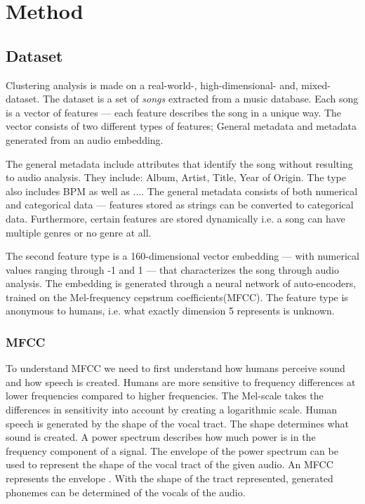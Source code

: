 \documentclass[../report.tex]{subfiles}
\begin{document}
\chapter{Method}
\section{Dataset}

Clustering analysis is made on a real-world-, high-dimensional- and, mixed-dataset. The dataset is a set of \textit{songs} extracted from a music database. Each song is a vector of features --- each feature describes the song in a unique way. The vector consists of two different types of features; General metadata and metadata generated from an audio embedding.

The general metadata include attributes that identify the song without resulting to audio analysis. They include: Album, Artist, Title, Year of Origin. The type also includes BPM as well as .... The general metadata consists of both numerical and categorical data --- features stored as strings can be converted to categorical data. Furthermore, certain features are stored dynamically i.e. a song can have multiple genres or no genre at all.

The second feature type is a 160-dimensional vector embedding --- with numerical values ranging through -1 and 1 --- that characterizes the song through audio analysis. The embedding is generated through a neural network of auto-encoders, trained on the Mel-frequency cepstrum coefficients(MFCC)\cite{Paliwal2010}. The feature type is anonymous to humans, i.e. what exactly dimension 5 represents is unknown.

\subsection{MFCC}
To understand MFCC we need to first understand how humans perceive sound and how speech is created. Humans are more sensitive to frequency differences at lower frequencies compared to higher frequencies. The Mel-scale takes the differences in sensitivity into account by creating a logarithmic scale. Human speech is generated by the shape of the vocal tract. The shape determines what sound is created.
A power spectrum describes how much power is in the frequency component of a signal. The envelope of the power spectrum can be used to represent the shape of the vocal tract of the given audio. An MFCC represents the envelope \cite{Paliwal2010}. With the shape of the tract represented, generated phonemes can be determined of the vocals of the audio.
\end{document}
